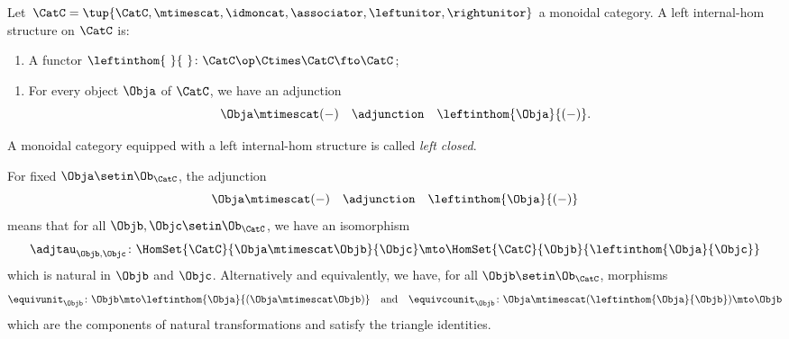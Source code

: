 \begin{ctdefinition}
    \label{def:left-internal-hom}
    Let~$\CatC = \tup{\CatC, \mtimescat, \idmoncat, \associator, \leftunitor, \rightunitor}$ a monoidal category.
    A left internal-hom structure on $\CatC$ is:

    \constit
    \begin{enumerate}
        \item A functor $\leftinthom{\ }{\ } \colon \CatC\op \Ctimes \CatC \fto \CatC$;
    \end{enumerate}

    \condit
    \begin{enumerate}
        \item For every object $\Obja$ of $\CatC$, we have an adjunction
              \begin{equation}
                  \Obja \mtimescat ( - ) \quad \adjunction \quad \leftinthom{\Obja}{( - )}.
              \end{equation}
    \end{enumerate}
    A monoidal category equipped with a left internal-hom structure is called \emph{left closed}.
\end{ctdefinition}

\begin{remark}
    \label{rem:left-internal-hom-unpacked}
    For fixed $\Obja \setin \Ob_\CatC$, the adjunction
    \begin{equation}
        \Obja \mtimescat ( - ) \quad \adjunction \quad \leftinthom{\Obja}{( - )}
    \end{equation}
    means that for all $\Objb, \Objc \setin \Ob_\CatC$, we have an isomorphism
    \begin{equation}
        \adjtau_{\Objb,\Objc} \colon \HomSet{\CatC}{\Obja \mtimescat \Objb}{\Objc} \mto \HomSet{\CatC}{\Objb}{\leftinthom{\Obja}{\Objc}}
    \end{equation}
    which is natural in $\Objb$ and $\Objc$.
    Alternatively and equivalently, we have, for all $\Objb \setin \Ob_\CatC$, morphisms
    \begin{equation}
        \equivunit_\Objb \colon \Objb \mto \leftinthom{\Obja}{(\Obja \mtimescat \Objb)} \quad \text{and} \quad \equivcounit_\Objb \colon \Obja \mtimescat (\leftinthom{\Obja}{\Objb}) \mto \Objb
    \end{equation}
    which are the components of natural transformations and satisfy the triangle identities.
\end{remark}

